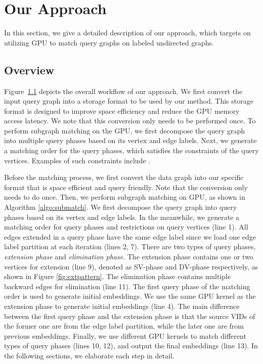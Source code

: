 \section{Our Approach}
In this section, we give a detailed description of our approach, which targets on utilizing GPU to match query graphs on labeled undirected graphs.
\subsection{Overview}
Figure~\ref{} depicts the overall workflow of our approach. We first convert the input query graph into a storage format to be used by our
method. This storage format is designed to improve space efficiency and reduce the GPU memory access latency. We note that this conversion
only needs to be performed once. To perform subgraph matching on the GPU, we first decompose the query graph into multiple query phases
based on its vertex and edge labels. Next, we generate a matching order for the query phases, which satisfies the constraints of the query
vertices. Examples of such constraints include .


Before the matching process, we first convert the data graph into our specific format that is space efficient and query friendly. Note that
the conversion only needs to do once. Then, we perform subgraph matching on GPU, as shown in Algorithm \ref{algo:submatch}. We first
decompose the query graph into query phases based on its vertex and edge labels. In the meanwhile, we generate a matching order for query
phases and restrictions on query vertices (line 1). All edges extended in a query phase have the same edge label since we load one edge
label partition at each iteration (lines 2, 7). There are two types of query phases, \emph{extension phase} and \emph{elimination phase}.
The extension phase contains one or two vertices for extension (line 9), denoted as SV-phase and DV-phase respectively, as shown in Figure
\ref{fig:extpattern}. The elimination phase contains multiple backward edges for elimination (line 11). The first query phase of the
matching order is used to generate initial embeddings. We use the same GPU kernel as the extension phase to generate initial embeddings
(line 4). The main difference between the first query phase and the extension phase is that the source VIDs of the former one are from the
edge label partition, while the later one are from previous embeddings. Finally, we use different GPU kernels to match different types of
query phases (lines 10, 12), and output the final embeddings (line 13). In the following sections, we elaborate each step in detail.

